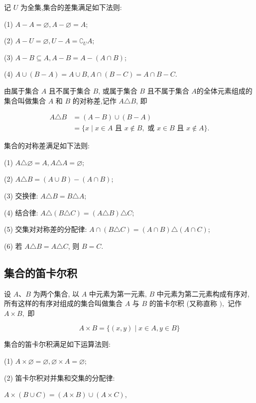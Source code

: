 记 $U$ 为全集,集合的差集满足如下法则:

(1) $A-A=\varnothing, A-\varnothing=A$;

(2) $A-U=\varnothing, U-A=\complement_{U} A$;

(3) $A-B \subseteq A, A-B=A-(A \cap B)$;

(4) $A \cup(B-A)=A \cup B, A \cap(B-C)=A \cap B-C$.

\begin{definition}
由属于集合 $A$ 且不属于集合 $B$, 或属于集合 $B$ 且不属于集合 $A$的全体元素组成的集合叫做集合 $A$ 和 $B$ 的对称差,记作 $A \triangle B$, 即

$$
\begin{aligned}
A \triangle B & =(A-B) \cup(B-A) \\
& =\{x \mid x \in A \text { 且 } x \notin B, \text { 或 } x \in B \text { 且 } x \notin A\} .
\end{aligned}
$$
\end{definition}

集合的对称差满足如下法则:

(1) $A \triangle \varnothing=A, A \triangle A=\varnothing$;

(2) $A \triangle B=(A \cup B)-(A \cap B)$;

(3) 交换律: $A \triangle B=B \triangle A$;

(4) 结合律: $A \triangle(B \triangle C)=(A \triangle B) \triangle C$;

(5) 交集对对称差的分配律: $A \cap(B \triangle C)=(A \cap B) \triangle(A \cap C)$;

(6) 若 $A \triangle B=A \triangle C$, 则 $B=C$.

\subsection{集合的笛卡尔积}
\begin{definition}
设 $A 、 B$ 为两个集合, 以 $A$ 中元素为第一元素, $B$ 中元素为第二元素构成有序对, 所有这样的有序对组成的集合叫做集合 $A$ 与 $B$ 的笛卡尔积 (又称直称 $),$ 记作 $A \times B , $ 即

$$
A \times B=\{(x, y) \mid x \in A, y \in B\}
$$
\end{definition}
集合的笛卡尔积满足如下运算法则:

(1) $A \times \varnothing=\varnothing, \varnothing \times A=\varnothing$;

(2) 笛卡尔积对并集和交集的分配律:

$A \times(B \cup C)=(A \times B) \cup(A \times C)$,

